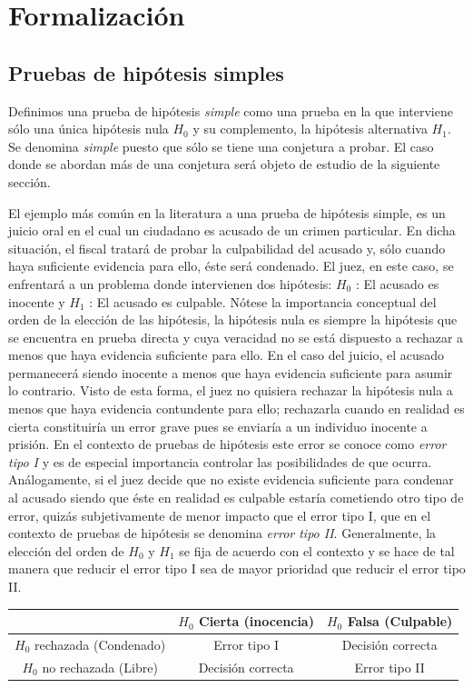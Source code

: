 \documentclass[11pt,letterpaper]{article}
\begin{document}
 \section{Formalización}
 \subsection{Pruebas de hipótesis simples}
 Definimos una prueba de hipótesis \textit{simple} como una prueba en la que interviene sólo una única hipótesis nula $H_0$ y su complemento, la hipótesis alternativa $H_1$. Se denomina \textit{simple} puesto que sólo se tiene una conjetura a probar. El caso donde se abordan más de una conjetura será objeto de estudio de la siguiente sección. 
 
El ejemplo más común en la literatura a una prueba de hipótesis simple, es un juicio oral en el cual
un ciudadano es acusado de un crimen particular. En dicha situación, el fiscal tratará de probar la
culpabilidad del acusado y, sólo cuando haya suficiente evidencia para ello, éste será condenado. El
juez, en este caso, se enfrentará a un problema donde intervienen dos hipótesis: $H_0$ : El acusado es
inocente y $H_1$ : El acusado es culpable. Nótese la importancia conceptual del orden de la elección de las hipótesis, la hipótesis nula es siempre la hipótesis que se encuentra en prueba directa y cuya
veracidad no se está dispuesto a rechazar a menos que haya evidencia suficiente para ello. En el caso
del juicio, el acusado permanecerá siendo inocente a menos que haya evidencia suficiente para asumir lo
contrario. Visto de esta forma, el juez no quisiera rechazar la hipótesis nula a menos que haya evidencia contundente para ello; rechazarla cuando en realidad es cierta constituiría un error grave pues se enviaría a un individuo inocente a prisión. En el contexto de pruebas de hipótesis este error se conoce como \textit{error tipo I} y es de especial importancia controlar las posibilidades de que ocurra. Análogamente, si el juez
decide que no existe evidencia suficiente para condenar al acusado siendo que éste en realidad es culpable
estaría cometiendo otro tipo de error, quizás subjetivamente de menor impacto que el error tipo I, que
en el contexto de pruebas de hipótesis se denomina \textit{error tipo II}. Generalmente, la elección del orden de
$H_0$ y $H_1$ se fija de acuerdo con el contexto y se hace de tal manera que reducir el error tipo I sea de
mayor prioridad que reducir el error tipo II.
\begin{table}[H]
\centering
	\begin{tabular}{ | c| c|c | } 
		\hline
		& $H_0$ Cierta (inocencia) & $H_0$ Falsa (Culpable)\\ 
		\hline
		$H_0$ rechazada (Condenado) & Error tipo I & Decisión correcta\\ 
		\hline
		$H_0$ no rechazada (Libre)  & Decisión correcta& Error tipo II\\ 
		\hline
	\end{tabular}
\end{table}
\end{document}
